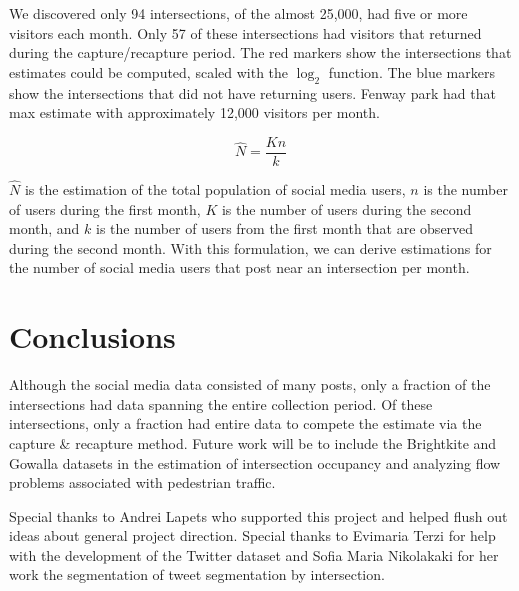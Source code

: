 \documentclass[twocolumn,10pt]{asme2ej}
\begin{document}
We discovered only 94 intersections, of the almost 25,000, had five or more visitors each month. Only 57 of these intersections had visitors that returned during the capture/recapture period. The red markers show the intersections that estimates could be computed, scaled with the $\log_2$ function. The blue markers show the intersections that did not have returning users. Fenway park had that max estimate with approximately 12,000 visitors per month. 


\begin{equation}
\hat{N} = \frac{Kn}{k}
\end{equation} 

$\hat{N}$ is the estimation of the total population of social media users, $n$ is the number of users during the first month, $K$ is the number of users during the second month, and $k$ is the number of users from the first month that are observed during the second month. With this formulation, we can derive estimations for the number of social media users that post near an intersection per month. 

\section{Conclusions}
Although the social media data consisted of many posts, only a fraction of the intersections had data spanning the entire collection period. Of these intersections, only a fraction had entire data to compete the estimate via the capture \& recapture method. Future work will be to include the Brightkite and Gowalla datasets in the estimation of intersection occupancy and analyzing flow problems associated with pedestrian traffic.

\begin{acknowledgment}
Special thanks to Andrei Lapets who supported this project and helped flush out ideas about general project direction. Special thanks to Evimaria Terzi for help with the development of the Twitter dataset and Sofia Maria Nikolakaki for her work the segmentation of tweet segmentation by intersection.
\end{acknowledgment}
\end{document}
